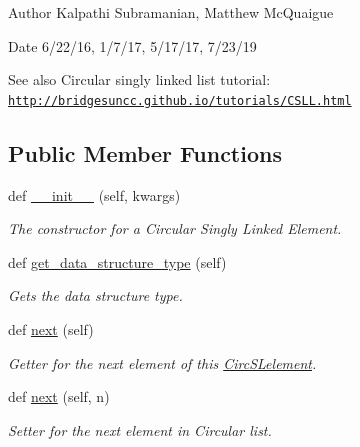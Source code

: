 \begin{DoxyAuthor}{Author}
Kalpathi Subramanian, Matthew Mc\+Quaigue
\end{DoxyAuthor}
\begin{DoxyDate}{Date}
6/22/16, 1/7/17, 5/17/17, 7/23/19
\end{DoxyDate}
\begin{DoxySeeAlso}{See also}
Circular singly linked list tutorial\+: \href{http://bridgesuncc.github.io/tutorials/CSLL.html}{\tt http\+://bridgesuncc.\+github.\+io/tutorials/\+C\+S\+L\+L.\+html} 
\end{DoxySeeAlso}
\subsection*{Public Member Functions}
\begin{DoxyCompactItemize}
\item 
def \hyperlink{classbridges_1_1circ__sl__element_1_1_circ_s_lelement_a8ffff39d70e7e94d8d8573e555a6ff35}{\+\_\+\+\_\+init\+\_\+\+\_\+} (self, kwargs)
\begin{DoxyCompactList}\small\item\em The constructor for a Circular Singly Linked Element. \end{DoxyCompactList}\item 
def \hyperlink{classbridges_1_1circ__sl__element_1_1_circ_s_lelement_a82b1dbb8592c943eb68161ee60ac3492}{get\+\_\+data\+\_\+structure\+\_\+type} (self)
\begin{DoxyCompactList}\small\item\em Gets the data structure type. \end{DoxyCompactList}\item 
def \hyperlink{classbridges_1_1circ__sl__element_1_1_circ_s_lelement_a5abc123aa4a20414a02785f3b1cc342a}{next} (self)
\begin{DoxyCompactList}\small\item\em Getter for the next element of this \hyperlink{classbridges_1_1circ__sl__element_1_1_circ_s_lelement}{Circ\+S\+Lelement}. \end{DoxyCompactList}\item 
def \hyperlink{classbridges_1_1circ__sl__element_1_1_circ_s_lelement_a0215303874e167e22f92e4adbdee1e84}{next} (self, n)
\begin{DoxyCompactList}\small\item\em Setter for the next element in Circular list. \end{DoxyCompactList}\end{DoxyCompactItemize}
